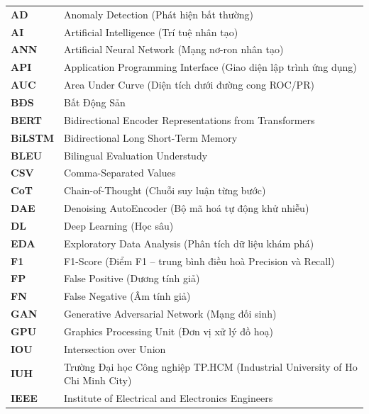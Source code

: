 
\setlength{\parskip}{0pt}

\begin{longtable}{@{}>{\bfseries}p{3cm}p{\dimexpr\textwidth-3cm-2\tabcolsep}@{}}
AD    & Anomaly Detection (Phát hiện bất thường) \\[4pt]
AI    & Artificial Intelligence (Trí tuệ nhân tạo) \\[4pt]
ANN   & Artificial Neural Network (Mạng nơ-ron nhân tạo) \\[4pt]
API   & Application Programming Interface (Giao diện lập trình ứng dụng) \\[4pt]
AUC   & Area Under Curve (Diện tích dưới đường cong ROC/PR) \\[4pt]
BĐS   & Bất Động Sản \\[4pt]
BERT  & Bidirectional Encoder Representations from Transformers \\[4pt]
BiLSTM & Bidirectional Long Short-Term Memory \\[4pt]
BLEU  & Bilingual Evaluation Understudy \\[4pt]
CSV   & Comma-Separated Values \\[4pt]
CoT   & Chain-of-Thought (Chuỗi suy luận từng bước) \\[4pt]
DAE   & Denoising AutoEncoder (Bộ mã hoá tự động khử nhiễu) \\[4pt]
DL    & Deep Learning (Học sâu) \\[4pt]
EDA   & Exploratory Data Analysis (Phân tích dữ liệu khám phá) \\[4pt]
F1    & F1-Score (Điểm F1 -- trung bình điều hoà Precision và Recall) \\[4pt]
FP    & False Positive (Dương tính giả) \\[4pt]
FN    & False Negative (Âm tính giả) \\[4pt]
GAN   & Generative Adversarial Network (Mạng đối sinh) \\[4pt]
GPU   & Graphics Processing Unit (Đơn vị xử lý đồ hoạ) \\[4pt]
IOU   & Intersection over Union \\[4pt]
IUH   & Trường Đại học Công nghiệp TP.HCM (Industrial University of Ho Chi Minh City) \\[4pt]
IEEE  & Institute of Electrical and Electronics Engineers \\[4pt]

\end{longtable}
